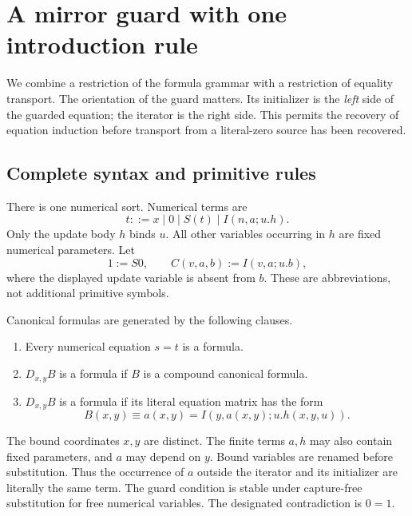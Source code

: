 
\section{A mirror guard with one introduction rule}
\label{mir:section}

We combine a restriction of the formula grammar with a restriction of
equality transport. The orientation of the guard matters. Its initializer
is the \emph{left} side of the guarded equation; the iterator is the right
side. This permits the recovery of equation induction before transport
from a literal-zero source has been recovered.

\subsection{Complete syntax and primitive rules}

There is one numerical sort. Numerical terms are
\[
 t ::= x\mid 0\mid S(t)\mid I(n,a;u.h).
\]
Only the update body $h$ binds $u$. All other variables occurring in $h$
are fixed numerical parameters. Let
\[
 1:=S0,\qquad C(v,a,b):=I(v,a;u.b),
\]
where the displayed update variable is absent from $b$. These are
abbreviations, not additional primitive symbols.

Canonical formulas are generated by the following clauses.
\begin{enumerate}
\item Every numerical equation $s=t$ is a formula.
\item $D_{x,y}B$ is a formula if $B$ is a compound canonical formula.
\item $D_{x,y}B$ is a formula if its literal equation matrix has the form
\[
       B(x,y)\equiv a(x,y)=I(y,a(x,y);u.h(x,y,u)).
       \tag{Mirror matrix}\label{mir:mirror-matrix}
\]
\end{enumerate}
The bound coordinates $x,y$ are distinct. The finite terms $a,h$ may
also contain fixed parameters, and $a$ may depend on $y$. Bound variables
are renamed before substitution. Thus the occurrence of $a$ outside the
iterator and its initializer are literally the same term. The guard
condition is stable under capture-free substitution for free numerical
variables. The designated contradiction is $0=1$.

